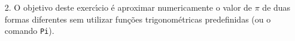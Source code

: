 \documentclass[11pt]{article}
\begin{document}
\begin{itemize}
\begin{itemize}
\end{itemize}
  
    
  
  
  
   
   
   
      
   
   
   
 
 
 
  \item[2.]   O objetivo deste exerc\'\i cio \'e aproximar numericamente o valor de $\pi$ de duas  formas diferentes sem utilizar fun\c{c}\~oes
   trigonom\'etricas predefinidas (ou o comando \texttt{Pi}). 
   

\end{itemize}
\end{document}
